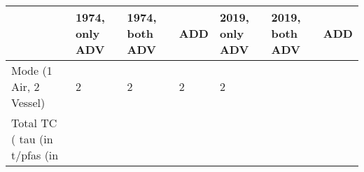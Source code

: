 \begin{tabular}{lllll}
& 1974, only ADV & 1974, both ADV & ADD & 2019, only ADV & 2019, both ADV & ADD \\ 
\hline 
Mode (1 Air, 2 Vessel) & 2 & 2 & 2 & 2 \\ 
Total TC (%
tau (in %
t/pfas (in %
\hline 
\end{tabular}